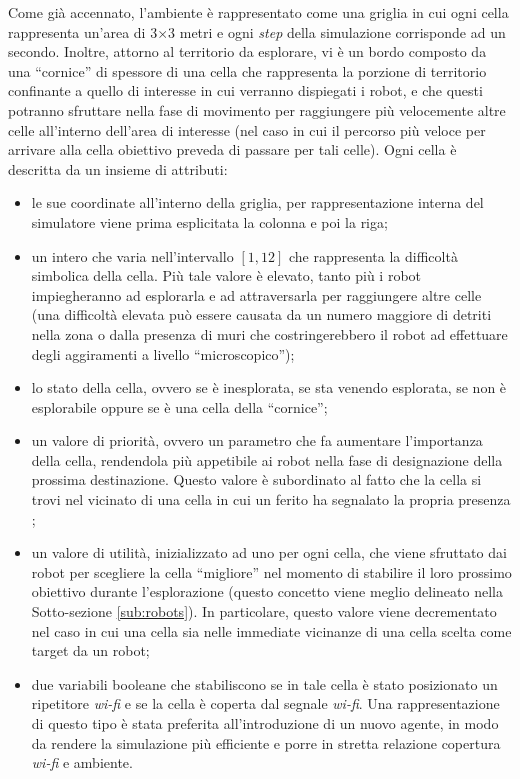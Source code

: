 Come già accennato, l'ambiente è rappresentato come una griglia in cui ogni cella rappresenta un'area di 3$\times$3 metri e ogni \textit{step} della simulazione corrisponde ad un secondo.
Inoltre, attorno al territorio da esplorare, vi è un bordo composto da una “cornice” di spessore di una cella che rappresenta la porzione di territorio confinante a quello di interesse in cui verranno dispiegati i robot, e che questi potranno sfruttare nella fase di movimento per raggiungere più velocemente altre celle all'interno dell'area di interesse (nel caso in cui il percorso più veloce per arrivare alla cella obiettivo preveda di passare per tali celle).
Ogni cella è descritta da un insieme di attributi:
\begin{itemize}
	\item le sue coordinate all'interno della griglia, per rappresentazione interna del simulatore viene prima esplicitata la colonna e poi la riga;
	\item un intero che varia nell'intervallo $\left[1, 12\right]$ che rappresenta la difficoltà simbolica della cella. Più tale valore è elevato, tanto più i robot impiegheranno ad esplorarla e ad attraversarla per raggiungere altre celle (una difficoltà elevata può essere causata da un numero maggiore di detriti nella zona o dalla presenza di muri che costringerebbero il robot ad effettuare degli aggiramenti a livello “microscopico”);
	\item lo stato della cella, ovvero se è inesplorata, se sta venendo esplorata, se non è esplorabile oppure se è una cella della “cornice”;
	\item un valore di priorità, ovvero un parametro che fa aumentare l'importanza della cella, rendendola più appetibile ai robot nella fase di designazione della prossima destinazione. Questo valore è subordinato al fatto che la cella si trovi nel vicinato di una cella in cui un ferito ha segnalato la propria presenza ;
	\item un valore di utilità, inizializzato ad uno per ogni cella, che viene sfruttato dai robot per scegliere la cella “migliore” nel momento di stabilire il loro prossimo obiettivo durante l'esplorazione (questo concetto viene meglio delineato nella Sotto-sezione \ref{sub:robots}). In particolare, questo valore viene decrementato nel caso in cui una cella sia nelle immediate vicinanze di una cella scelta come target da un robot;
	\item due variabili booleane che stabiliscono se in tale cella è stato posizionato un ripetitore \textit{wi-fi} e se la cella è coperta dal segnale \textit{wi-fi}. Una rappresentazione di questo tipo è stata preferita all'introduzione di un nuovo agente, in modo da rendere la simulazione più efficiente e porre in stretta relazione copertura \textit{wi-fi} e ambiente.
\end{itemize}

